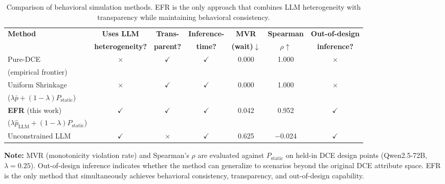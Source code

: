 
\begin{table}[t]
\centering
\caption{Comparison of behavioral simulation methods. EFR is the only approach that combines LLM heterogeneity with transparency while maintaining behavioral consistency.}
\label{tab:capabilities}
\footnotesize
\begin{tabular}{lcccccc}
\toprule
\multirow{2}{*}{\textbf{Method}} &
  \multicolumn{1}{c}{\textbf{Uses LLM}} &
  \multicolumn{1}{c}{\textbf{Trans-}} &
  \multicolumn{1}{c}{\textbf{Inference-}} &
  \multicolumn{1}{c}{\textbf{MVR}} &
  \multicolumn{1}{c}{\textbf{Spearman}} &
  \multicolumn{1}{c}{\textbf{Out-of-design}} \\
  &
  \multicolumn{1}{c}{\textbf{heterogeneity?}} &
  \multicolumn{1}{c}{\textbf{parent?}} &
  \multicolumn{1}{c}{\textbf{time?}} &
  \multicolumn{1}{c}{\textbf{(wait)$\downarrow$}} &
  \multicolumn{1}{c}{$\rho$$\uparrow$} &
  \multicolumn{1}{c}{\textbf{inference?}} \\
\midrule
Pure-DCE  &  $\times$ &  $\checkmark$ &  $\checkmark$ & {\color{green!40!black}0.000} & 1.000 & $\times$ \\
\quad (empirical frontier) & & & & & & \\
\midrule
Uniform Shrinkage & $\times$ & $\checkmark$ & $\checkmark$ & {\color{green!40!black}0.000} & 1.000 & $\times$ \\
\quad ($\lambda\bar{p} + (1-\lambda)P_{\text{static}}$) & & & & & & \\
\midrule
\textbf{EFR} (this work) & {\color{green!40!black}$\checkmark$} & {\color{green!40!black}$\checkmark$} & {\color{green!40!black}$\checkmark$} & 0.042 & 0.952 & {\color{green!40!black}$\checkmark$} \\
\quad ($\lambda\hat{p}_{\text{LLM}} + (1-\lambda)P_{\text{static}}$) & & & & & & \\
\midrule
Unconstrained LLM & $\checkmark$ & $\times$ & $\checkmark$ & 0.625 & $-$0.024 & $\checkmark$ \\
\bottomrule
\end{tabular}

\smallskip
\raggedright\footnotesize
{\bf Note:} MVR (monotonicity violation rate) and Spearman's $\rho$ are evaluated against $P_{\text{static}}$ on held-in DCE design points (Qwen2.5-72B, $\lambda=0.25$). Out-of-design inference indicates whether the method can generalize to scenarios beyond the original DCE attribute space. EFR is the only method that simultaneously achieves behavioral consistency, transparency, and out-of-design capability.
\end{table}
\endinput
